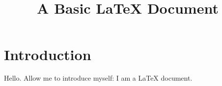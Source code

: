 \documentclass{report}
\begin{document}
\title{A Basic LaTeX Document}

\section{Introduction}

Hello. Allow me to introduce myself: I am a LaTeX document.
\end{document}

